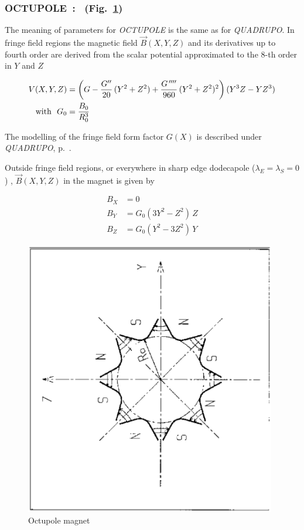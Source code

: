 \newpage

\subsubsection*{OCTUPOLE~: \OCTUPOLETitl\  (Fig.~\protect\ref{fig24}) } \label{OCTUPOLE}  
\medskip 

 The meaning of parameters for \textsl{OCTUPOLE} is the same as for 
\textsl{QUADRUPO}.  In fringe field regions the magnetic field $ \vec  B(X,Y,Z)$ and 
its derivatives up to fourth order are derived from the scalar potential 
approximated to the 8-th order in $ Y $ and $ Z $

\begin{align*}
	V(X,Y,Z) &   =   \left(G-\dfrac{G^{\prime\prime} }{ 20} \, (Y^2+Z^2)+
	              \dfrac{G^{\,\prime\prime\prime\prime} }{ 960}\, (Y^2+Z^2)^2 \right) (Y^3Z-YZ^3)   \\
	\text{with } ~ G_0 &   =  \dfrac{ B_0 }{ R^3_0} 
\end{align*}

\noindent The  modelling of the fringe field form factor  $G(X)$
 is described under \textsl{QUADRUPO}, p.~\pageref{QUADRUPO}. 

\medskip

\noindent Outside fringe field regions, or everywhere in sharp edge dodecapole
($ \lambda_ E=\lambda_ S=0$) , $ \vec  B(X,Y,Z) $ in the magnet is given by 

\begin{align*}
	B_X &   =   0 \\
	B_Y &   =   G_0(3Y^2-Z^2)\, Z  \\
	B_Z &   = G_0(Y^2-3Z^2) \, Y    
\end{align*}
\vfill

\begin{figure}[H]
\centerline{\includegraphics[height=12cm,angle=-90]{Fig24.ps}}
\caption{\label{fig24}Octupole magnet}
\end{figure}
\vfill

